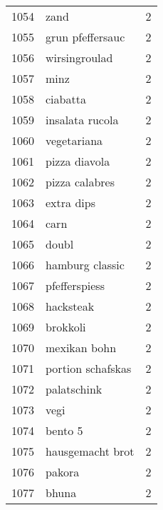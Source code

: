 \begin{tabular}{llr}
1054 &                                               zand &      2 \\
1055 &                                   grun pfeffersauc &      2 \\
1056 &                                      wirsingroulad &      2 \\
1057 &                                               minz &      2 \\
1058 &                                           ciabatta &      2 \\
1059 &                                    insalata rucola &      2 \\
1060 &                                        vegetariana &      2 \\
1061 &                                      pizza diavola &      2 \\
1062 &                                     pizza calabres &      2 \\
1063 &                                         extra dips &      2 \\
1064 &                                               carn &      2 \\
1065 &                                              doubl &      2 \\
1066 &                                    hamburg classic &      2 \\
1067 &                                      pfefferspiess &      2 \\
1068 &                                          hacksteak &      2 \\
1069 &                                           brokkoli &      2 \\
1070 &                                       mexikan bohn &      2 \\
1071 &                                  portion schafskas &      2 \\
1072 &                                        palatschink &      2 \\
1073 &                                               vegi &      2 \\
1074 &                                            bento 5 &      2 \\
1075 &                                   hausgemacht brot &      2 \\
1076 &                                             pakora &      2 \\
1077 &                                              bhuna &      2 \\

\end{tabular}
